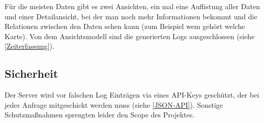 \documentclass[../main.tex]{subfiles}
\begin{document}
\noindent Für die meisten Daten gibt es zwei Ansichten, ein mal eine Auflistung aller Daten und einer Detailansicht, bei der man noch mehr Informationen bekommt und die Relationen zwischen den Daten sehen kann (zum Beispiel wem gehört welche Karte). Von dem Ansichtsmodell sind die generierten Logs ausgeschlossen (siehe \ref{Zeiterfassung}).

\subsection{Sicherheit}

Der Server wird vor falschen Log Einträgen via eines API-Keys geschützt, der bei jeder Anfrage mitgeschickt werden muss (siehe \ref{JSON-API}). Sonstige Schutzmaßnahmen sprengten leider den Scope des Projektes.
\end{document}
